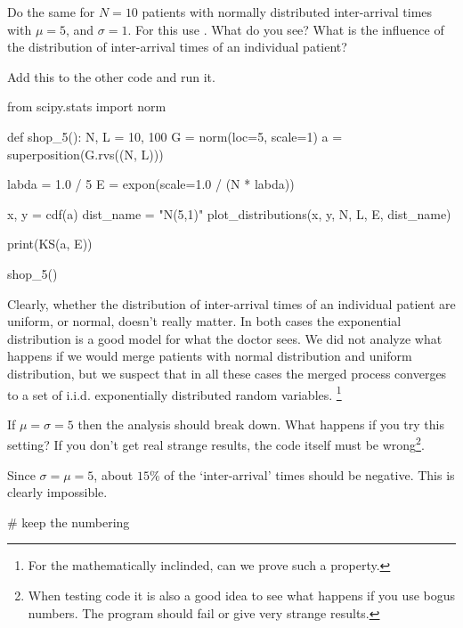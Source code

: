 \begin{exercise}
Do the same for $N=10$ patients with normally distributed inter-arrival times with $\mu=5$, and $\sigma =1$.
For this use . What do you see? What is the influence of the distribution of inter-arrival times of an individual patient?
\begin{solution}
Add this to the other code and run it.
\begin{pyverbatim}
from scipy.stats import norm


def shop_5():
    N, L = 10, 100
    G = norm(loc=5, scale=1)
    a = superposition(G.rvs((N, L)))

    labda = 1.0 / 5
    E = expon(scale=1.0 / (N * labda))

    x, y = cdf(a)
    dist_name = "N(5,1)"
    plot_distributions(x, y, N, L, E, dist_name)

    print(KS(a, E))


shop_5()
\end{pyverbatim}

Clearly, whether the distribution of inter-arrival times of an individual patient are uniform, or normal, doesn't really matter.
In both cases the exponential distribution is a good model for what the doctor sees.
We did not analyze what happens if we would merge patients with normal distribution and uniform distribution, but we suspect that in all these cases the merged process converges to a set of i.i.d.
exponentially distributed random variables.
\footnote{For the mathematically inclinded, can we prove such a property.}

\end{solution}
\end{exercise}

\begin{exercise}
  If $\mu=\sigma=5$ then the analysis should break down.
  What happens if you try this setting?
  If you don't get real strange results, the code itself must be wrong\footnote{When testing code it is also a good idea to see what happens if you use bogus numbers.
    The program should fail or give very strange results.}.
\begin{solution}
  Since $\sigma=\mu=5$, about $15\%$ of the `inter-arrival' times should be negative. This is clearly impossible.
\begin{pyverbatim}
# keep the numbering
\end{pyverbatim}
\end{solution}
\end{exercise}



